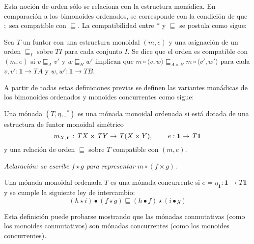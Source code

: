 Esta noción de orden sólo se relaciona con la estructura monádica. En comparación a los bimonoides ordenados, se corresponde con la condición de que $;$ sea compatible con $\sqsubseteq$. La compatibilidad entre $*$ y $\sqsubseteq$ se postula como sigue:

\begin{definition}
Sea $\mathit{T}$ un funtor con una estructura monoidal $(m,e)$ y una asignación de un orden $\sqsubseteq_I$ sobre $\mathit{T} I$ para cada conjunto $I$. Se dice que el orden es compatible con $(m,e)$ si $v \sqsubseteq_A v'$ y $w \sqsubseteq_B w'$ implican que $m \circ \langle v,w \rangle \sqsubseteq_{A \times B} m \circ \langle v',w' \rangle$ para cada $v,v' : \mathbf{1} \rightarrow \mathit{T} A$ y $w,w' : \mathbf{1} \rightarrow \mathit{T} B$. 
\end{definition}

A partir de todas estas definiciones previas se definen las variantes monádicas de los bimonoides ordenados y monoides concurrentes como sigue:

\begin{definition}
Una mónada $(\mathit{T},\eta,\_^*)$ es una mónada monoidal ordenada si está dotada de una estructura de funtor monoidal simétrico 
\begin{equation*}
m_{X,Y} : \mathit{T} X \times \mathit{T} Y \rightarrow \mathit{T} (X \times Y) \text{, \qquad} e : \mathbf{1} \rightarrow \mathit{T} \mathbf{1} 
\end{equation*}
y una relación de orden $\sqsubseteq$ sobre $\mathit{T}$ compatible con $(m,e)$.
\end{definition}

\textit{Aclaración: se escribe $f \star g$ para representar $m \circ (f \times g)$.}

\begin{definition}
Una mónada monoidal ordenada $\mathit{T}$ es una mónada concurrente si $e = \eta_{\mathbf{1}} : \mathbf{1} \rightarrow \mathit{T} \mathbf{1}$ y se cumple la siguiente ley de intercambio:
\begin{equation*}
(h \star i) \bullet (f \star g) \sqsubseteq (h \bullet f) \star (i \bullet g)
\end{equation*}
\end{definition}

Esta definición puede probarse mostrando que las mónadas conmutativas (como los monoides conmutativos) son mónadas concurrentes (como los monoides concurrentes). 

